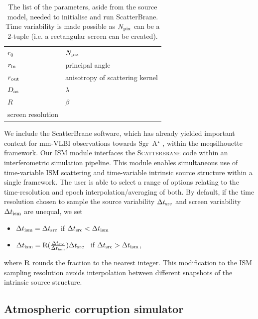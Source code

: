 \begin{table}\label{tab:parm_ism}
\centering
\caption{The list of the parameters, aside from the source model, needed to initialise and run {\sc ScatterBrane}. Time variability is made possible as $N_{\rm pix}$ can be a 2-tuple (i.e. a rectangular screen can be created).
}
\begin{tabular}{ll}
$r_0$            & $N_{\rm pix}$ \\
$r_{\rm in}$     & principal angle             \\
$r_{\rm out}$    & anisotropy of scattering kernel    \\
$D_{\rm os}$     & $\lambda$        \\
$R$              & $\beta$          \\
screen resolution &               
\end{tabular}
\end{table}



We include the {\sc ScatterBrane} software, which has already yielded important context for mm-VLBI observations towards Sgr~A$^\star$ \citep[e.g.][]{Ortiz_2016}, within the {\sc meqsilhouette} framework. Our ISM module interfaces the \textsc{Scatterbrane} code within an interferometric simulation pipeline. This module enables simultaneous use of time-variable ISM scattering and time-variable intrinsic source structure within a single framework. The user is able to select a range of options relating to the time-resolution and epoch interpolation/averaging of both. By default, if the time resolution chosen to sample the source variability $\Delta t_{\rm src}$ and screen variability $\Delta t_{\rm ism}$ are unequal, we set  
\begin{itemize}
 \setlength\itemsep{1em}
\item $\Delta t_{\rm ism}=\Delta t_{\rm src}$ \qquad \qquad if \qquad  $\Delta t_{\rm src} < \Delta t_{\rm ism}$
\item $\Delta t_{\rm ism}={\rm R}(\frac{\Delta t_{\rm src}}{\Delta t_{\rm ism}})\Delta t_{\rm src}$ \ if \qquad  $\Delta t_{\rm src} > \Delta t_{\rm ism}$,
\end{itemize}
where ${\rm R}$ rounds the fraction to the nearest integer.  This modification to the ISM sampling resolution avoids interpolation between different snapshots of the intrinsic source structure.


\subsection{Atmospheric corruption simulator}\label{sec:trop_imp}

